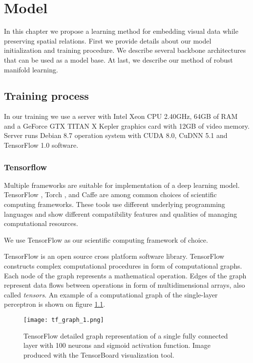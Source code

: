 
\chapter{Model}\label{ch:mode}

In this chapter we propose a learning method for embedding visual data while preserving spatial relations.
First we provide details about our model initialization and training procedure.
We describe several backbone architectures that can be used as a model base.
At last, we describe our method of robust manifold learning.


\section{Training process}

In our training we use a server with Intel Xeon CPU 2.40GHz, 64GB of RAM and a GeForce GTX TITAN X Kepler graphics card with 12GB of video memory. Server runs Debian 8.7 operation system with CUDA 8.0, CuDNN 5.1 and TensorFlow 1.0 software.

\subsection{Tensorflow}

Multiple frameworks are suitable for implementation of a deep learning model. TensorFlow \cite{GoogleResearch2015, Abadi2016}, Torch \cite{torch}, and Caffe \cite{jia2014caffe} are among common choices of scientific computing frameworks.
These tools use different underlying programming languages and show different compatibility features and qualities of managing computational resources.

We use TensorFlow as our scientific computing framework of choice.

TensorFlow is an open source cross platform software library.
TensorFlow constructs complex computational procedures in form of computational graphs.
Each node of the graph represents a mathematical operation.
Edges of the graph represent data flows between operations in form of multidimensional arrays, also called \textit{tensors}.
An example of a computational graph of the single-layer perceptron is shown on figure \ref{fig:tf_graph}.

\begin{figure}[h!]
  \centering
    \texttt{[image: tf\_graph\_1.png]}
  \caption{TensorFlow detailed graph representation of a single fully connected layer with 100 neurons and sigmoid activation function. Image produced with the TensorBoard visualization tool.}
  \label{fig:tf_graph}
\end{figure}

